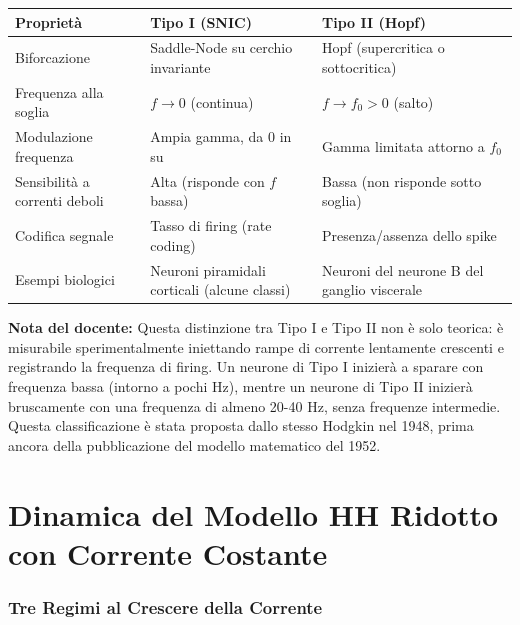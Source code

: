 \begin{table}[htbp]
    \centering
    \renewcommand{\arraystretch}{1.3}
    \begin{tabularx}{\textwidth}{|>{\raggedright\arraybackslash}p{3cm}|X|X|}
    \hline
    \textbf{Proprietà} & \textbf{Tipo I (SNIC)} & \textbf{Tipo II (Hopf)} \\
    \hline
    Biforcazione & Saddle-Node su cerchio invariante & Hopf (supercritica o sottocritica) \\
    \hline
    Frequenza alla soglia & $f \to 0$ (continua) & $f \to f_0 > 0$ (salto) \\
    \hline
    Modulazione frequenza & Ampia gamma, da 0 in su & Gamma limitata attorno a $f_0$ \\
    \hline
    Sensibilità a correnti deboli & Alta (risponde con $f$ bassa) & Bassa (non risponde sotto soglia) \\
    \hline
    Codifica segnale & Tasso di firing (rate coding) & Presenza/assenza dello spike \\
    \hline
    Esempi biologici & Neuroni piramidali corticali (alcune classi) & Neuroni del neurone B del ganglio viscerale \\
    \hline
    \end{tabularx}
\end{table}

\begin{tcolorbox}[colback=gray!5, colframe=gray!40, arc=2mm, boxrule=0.5pt]
\textbf{Nota del docente:} Questa distinzione tra Tipo I e Tipo II non è solo teorica: è misurabile sperimentalmente iniettando rampe di corrente lentamente crescenti e registrando la frequenza di firing. Un neurone di Tipo I inizierà a sparare con frequenza bassa (intorno a pochi Hz), mentre un neurone di Tipo II inizierà bruscamente con una frequenza di almeno 20-40 Hz, senza frequenze intermedie. Questa classificazione è stata proposta dallo stesso Hodgkin nel 1948, prima ancora della pubblicazione del modello matematico del 1952.
\end{tcolorbox}


\section{Dinamica del Modello HH Ridotto con Corrente Costante}

\subsubsection{Tre Regimi al Crescere della Corrente}

